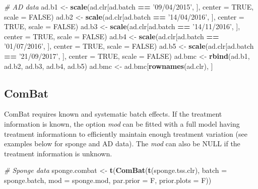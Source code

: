 \documentclass[]{book}
\newenvironment{Shaded}{\begin{snugshade}}{\end{snugshade}}
\newcommand{\KeywordTok}[1]{\textcolor[rgb]{0.13,0.29,0.53}{\textbf{#1}}}
\newcommand{\DataTypeTok}[1]{\textcolor[rgb]{0.13,0.29,0.53}{#1}}
\newcommand{\StringTok}[1]{\textcolor[rgb]{0.31,0.60,0.02}{#1}}
\newcommand{\CommentTok}[1]{\textcolor[rgb]{0.56,0.35,0.01}{\textit{#1}}}
\newcommand{\OtherTok}[1]{\textcolor[rgb]{0.56,0.35,0.01}{#1}}
\newcommand{\OperatorTok}[1]{\textcolor[rgb]{0.81,0.36,0.00}{\textbf{#1}}}
\newcommand{\NormalTok}[1]{#1}
\begin{document}
\begin{Shaded}
\begin{Highlighting}[]
\CommentTok{# AD data}
\NormalTok{ad.b1 <-}\StringTok{ }\KeywordTok{scale}\NormalTok{(ad.clr[ad.batch }\OperatorTok{==}\StringTok{ '09/04/2015'}\NormalTok{, ], }\DataTypeTok{center =} \OtherTok{TRUE}\NormalTok{, }\DataTypeTok{scale =} \OtherTok{FALSE}\NormalTok{)}
\NormalTok{ad.b2 <-}\StringTok{ }\KeywordTok{scale}\NormalTok{(ad.clr[ad.batch }\OperatorTok{==}\StringTok{ '14/04/2016'}\NormalTok{, ], }\DataTypeTok{center =} \OtherTok{TRUE}\NormalTok{, }\DataTypeTok{scale =} \OtherTok{FALSE}\NormalTok{)}
\NormalTok{ad.b3 <-}\StringTok{ }\KeywordTok{scale}\NormalTok{(ad.clr[ad.batch }\OperatorTok{==}\StringTok{ '14/11/2016'}\NormalTok{, ], }\DataTypeTok{center =} \OtherTok{TRUE}\NormalTok{, }\DataTypeTok{scale =} \OtherTok{FALSE}\NormalTok{)}
\NormalTok{ad.b4 <-}\StringTok{ }\KeywordTok{scale}\NormalTok{(ad.clr[ad.batch }\OperatorTok{==}\StringTok{ '01/07/2016'}\NormalTok{, ], }\DataTypeTok{center =} \OtherTok{TRUE}\NormalTok{, }\DataTypeTok{scale =} \OtherTok{FALSE}\NormalTok{)}
\NormalTok{ad.b5 <-}\StringTok{ }\KeywordTok{scale}\NormalTok{(ad.clr[ad.batch }\OperatorTok{==}\StringTok{ '21/09/2017'}\NormalTok{, ], }\DataTypeTok{center =} \OtherTok{TRUE}\NormalTok{, }\DataTypeTok{scale =} \OtherTok{FALSE}\NormalTok{)}
\NormalTok{ad.bmc <-}\StringTok{ }\KeywordTok{rbind}\NormalTok{(ad.b1, ad.b2, ad.b3, ad.b4, ad.b5)}
\NormalTok{ad.bmc <-}\StringTok{ }\NormalTok{ad.bmc[}\KeywordTok{rownames}\NormalTok{(ad.clr), ]}
\end{Highlighting}
\end{Shaded}

\subsection{ComBat}\label{combat}

ComBat requires known and systematic batch effects. If the treatment
information is known, the option \emph{mod} can be fitted with a full
model having treatment informationn to efficiently maintain enough
treatment variation (see examples below for sponge and AD data). The
\emph{mod} can also be NULL if the treatment information is unknown.

\begin{Shaded}
\begin{Highlighting}[]
\CommentTok{# Sponge data}
\NormalTok{sponge.combat <-}\StringTok{ }\KeywordTok{t}\NormalTok{(}\KeywordTok{ComBat}\NormalTok{(}\KeywordTok{t}\NormalTok{(sponge.tss.clr), }\DataTypeTok{batch =}\NormalTok{ sponge.batch, }
                          \DataTypeTok{mod =}\NormalTok{ sponge.mod, }\DataTypeTok{par.prior =}\NormalTok{ F, }\DataTypeTok{prior.plots =}\NormalTok{ F))}
\end{Highlighting}
\end{Shaded}
\end{document}
